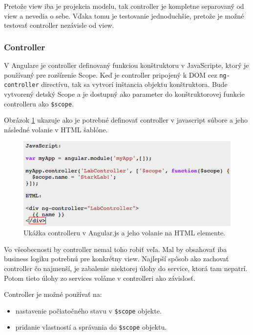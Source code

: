 Pretože view iba je projekcia modelu, tak controller je kompletne separovaný od view a nevedia o sebe. Vďaka tomu je testovanie jednoduchšie, pretože je možné testovať controller nezávisle od view.\cite{angular-docs}

\subsubsection{Controller}
V Angulare je controller definovaný funkciou konštruktoru v JavaScripte, ktorý je používaný pre rozšírenie Scope. Keď je controller pripojený k DOM cez \verb|ng-controller| directívu, tak sa vytvorí inštancia objektu konštruktora. Bude vytvorený detský Scope a je dostupný ako parameter do konštruktorovej funkcie controlleru ako \verb|$scope|.

Obrázok \ref{img-angular-controller-def} ukazuje ako je potrebné definovať controller v javascript súbore a jeho následné volanie v HTML šablóne.

\begin{figure}[H]
  \centering
  \includegraphics[scale=0.7]{img/code/angular-controller-def.png}
  \caption{Ukážka controlleru v Angular.js a jeho volanie na HTML elemente.}
  \label{img-angular-controller-def}
\end{figure}

Vo všeobecnosti by controller nemal toho robiť veľa. Mal by obsahovať iba business logiku potrebnú pre konkrétny view. Najlepší spôsob ako zachovať controller čo najmenší, je zabalenie niektorej úlohy do service, ktorá tam nepatrí. Potom tieto úlohy zo services voláme v controlleri ako závislosť.\cite{angular-docs}

\noindent Controller je možné používať na:
\begin{itemize}
\item nastavenie počiatočného stavu v \verb|$scope| objekte.
\item pridanie vlastností a správania do \verb|$scope| objektu.\\
\end{itemize}

